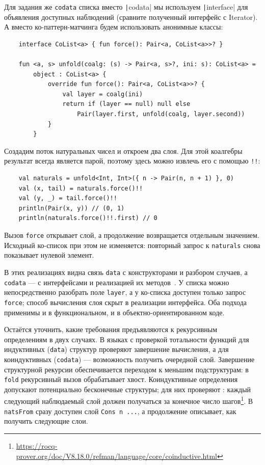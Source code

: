 Для задания же \texttt{codata} списка вместо \texttt|codata| мы используем \texttt|interface| для объявления доступных наблюдений (сравните полученный интерфейс с Iterator).
А вместо ко-паттерн-матчинга будем использовать анонимные классы:
\begin{verbatim}
    interface CoList<a> { fun force(): Pair<a, CoList<a>>? }

    fun <a, s> unfold(coalg: (s) -> Pair<a, s>?, ini: s): CoList<a> =
        object : CoList<a> {
            override fun force(): Pair<a, CoList<a>>? {
                val layer = coalg(ini)
                return if (layer == null) null else
                    Pair(layer.first, unfold(coalg, layer.second))
            }
        }
\end{verbatim}
Создадим поток натуральных чисел и откроем два слоя.
Для этой коалгебры результат всегда является парой, поэтому здесь можно извлечь его с помощью \texttt{!!}:
\begin{verbatim}
    val naturals = unfold<Int, Int>({ n -> Pair(n, n + 1) }, 0)
    val (x, tail) = naturals.force()!!
    val (y, _) = tail.force()!!
    println(Pair(x, y)) // (0, 1)
    println(naturals.force()!!.first) // 0
\end{verbatim}
Вызов \texttt{force} открывает слой, а продолжение возвращается отдельным значением.
Исходный ко-список при этом не изменяется: повторный запрос к \texttt{naturals} снова показывает нулевой элемент.

В этих реализациях видна связь \texttt{data} с конструкторами и разбором случаев, а \texttt{codata} --- с интерфейсами и реализацией их методов~\cite{downen2019codata}.
У списка можно непосредственно разобрать поле \texttt{layer}, а у ко-списка доступен только запрос \texttt{force}; способ вычисления слоя скрыт в реализации интерфейса.
Оба подхода применимы и в функциональном, и в объектно-ориентированном коде.

Остаётся уточнить, какие требования предъявляются к рекурсивным определениям в двух случаях.
В языках с проверкой тотальности функций для индуктивных (\texttt{data}) структур проверяют завершение вычисления, а для коиндуктивных (\texttt{codata}) --- возможность получить очередной слой.
Завершение структурной рекурсии обеспечивается переходом к меньшим подструктурам: в \texttt{fold} рекурсивный вызов обрабатывает хвост.
Коиндуктивные определения допускают потенциально бесконечные структуры; для них проверяют : каждый следующий наблюдаемый слой должен получаться за конечное число шагов\footnote{\url{https://rocq-prover.org/doc/V8.18.0/refman/language/core/coinductive.html}}.
В \texttt{natsFrom} сразу доступен слой \texttt{Cons n ...}, а продолжение описывает, как получить следующие слои.

